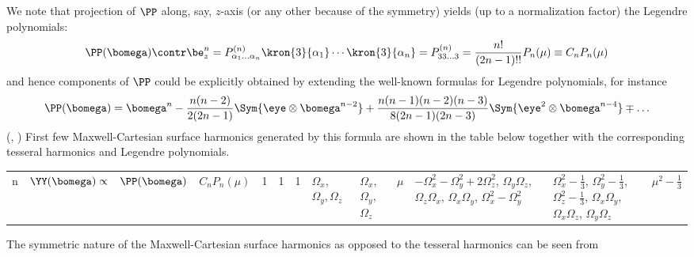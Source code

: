 We note that projection of $\PP$ along, say, $z$-axis (or any other because of the symmetry) yields (up to a
normalization factor) the Legendre polynomials:
\begin{equation}\label{eq:leg}
  \PP(\bomega)\contr\be_z^n = P^{(n)}_{\alpha_1\ldots\alpha_n}\kron{3}{\alpha_1}\cdots\kron{3}{\alpha_n} = P^{(n)}_{33\ldots3} = \frac{n!}{(2n-1)!!}P_n(\mu) \equiv C_n P_n(\mu)
\end{equation}
and hence components of $\PP$ could be explicitly obtained by extending the well-known formulas for Legendre 
polynomials, for instance
\begin{equation}\label{eq:conn1}
  \PP(\bomega) = \bomega^n - \frac{n(n-2)}{2(2n-1)}\Sym{\eye\otimes\bomega^{n-2}} + \frac{n(n-1)(n-2)(n-3)}{8(2n-1)(2n-3)}\Sym{\eye^2\otimes\bomega^{n-4}}\mp\ldots
\end{equation}
(\cite[Chap. VI]{Byerly}, \cite{Johnston1})
First few Maxwell-Cartesian surface harmonics generated by this formula are shown in the table below together with the 
corresponding tesseral harmonics and Legendre polynomials.
\begin{center}
	\begin{tabular}{|A|B|C|D|}
	  \hline
		n & $\YY(\bomega)\propto$ & $\PP(\bomega)$ & $C_n P_n(\mu)$  & 1 & 1 & 1 & $\Omega_x$, $\Omega_y, \Omega_z$ & $\Omega_x$, $\Omega_y$, $\Omega_z$ & $\mu$  & $-\Omega_x^2-\Omega_y^2 + 2\Omega_z^2$, 
		    $\Omega_y\Omega_z$, 
		    $\Omega_z\Omega_x$,
		    $\Omega_x\Omega_y$,
		    $\Omega_x^2 - \Omega_y^2$ & $\Omega_x^2-\tfrac13$, 
		                                $\Omega_y^2-\tfrac13$, 
		                                $\Omega_z^2-\tfrac13$, 
		                                $\Omega_x\Omega_y$, 
		                                $\Omega_x\Omega_z$, 
		                                $\Omega_y\Omega_z$ & $\mu^2 - \tfrac13$ \nl
	\end{tabular}
	\label{tab:harmonics}
\end{center}
 The symmetric nature of the Maxwell-Cartesian surface harmonics as opposed to the tesseral harmonics can be seen from 

